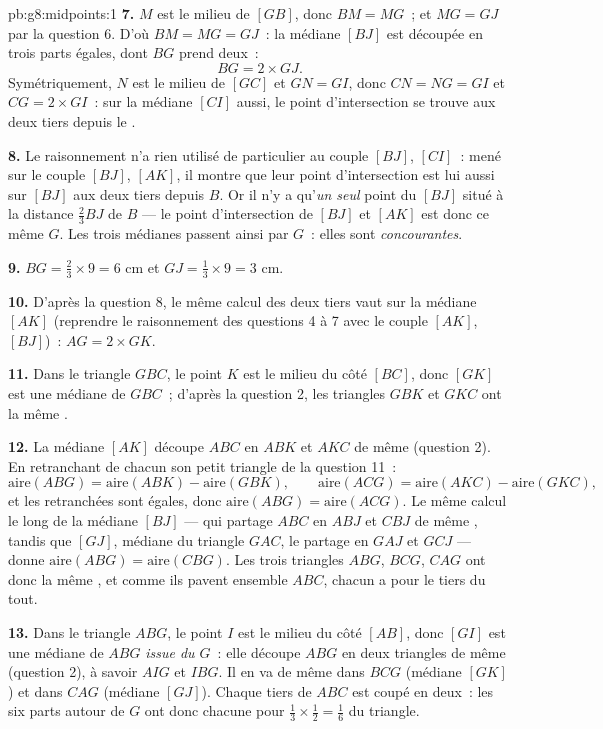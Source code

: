 \begin{solution}{pb:g8:midpoints:1}
\textbf{7.} $M$ est le milieu de $[GB]$, donc $BM = MG$~; et
$MG = GJ$ par la question 6. D'où $BM = MG = GJ$~: la médiane
$[BJ]$ est découpée en trois parts égales, dont $BG$ prend deux~:
\[
BG = 2 \times GJ .
\]
Symétriquement, $N$ est le milieu de $[GC]$ et $GN = GI$, donc
$CN = NG = GI$ et $CG = 2 \times GI$~: sur la médiane $[CI]$ aussi,
le point d'intersection se trouve aux deux tiers depuis le .

\textbf{8.} Le raisonnement n'a rien utilisé de particulier au
couple $[BJ]$, $[CI]$~: mené sur le couple $[BJ]$, $[AK]$, il montre
que leur point d'intersection est lui aussi sur $[BJ]$ aux deux
tiers depuis $B$. Or il n'y a qu'\emph{un seul} point du 
$[BJ]$ situé à la distance $\frac23 BJ$ de $B$ --- le point
d'intersection de $[BJ]$ et $[AK]$ est donc ce même $G$. Les trois
médianes passent ainsi par $G$~: elles sont \emph{concourantes}.

\textbf{9.} $BG = \frac23 \times 9 = 6$ cm et
$GJ = \frac13 \times 9 = 3$ cm.

\textbf{10.} D'après la question 8, le même calcul des deux tiers
vaut sur la médiane $[AK]$ (reprendre le raisonnement des questions
4 à 7 avec le couple $[AK]$, $[BJ]$)~: $AG = 2 \times GK$.

\textbf{11.} Dans le triangle $GBC$, le point $K$ est le milieu du
côté $[BC]$, donc $[GK]$ est une médiane de $GBC$~; d'après la
question 2, les triangles $GBK$ et $GKC$ ont la même .

\textbf{12.} La médiane $[AK]$ découpe $ABC$ en $ABK$ et $AKC$ de
même  (question 2). En retranchant de chacun son petit triangle
de la question 11~:
\[
\text{aire}(ABG) = \text{aire}(ABK) - \text{aire}(GBK),
\qquad
\text{aire}(ACG) = \text{aire}(AKC) - \text{aire}(GKC),
\]
et les  retranchées sont égales, donc
$\text{aire}(ABG) = \text{aire}(ACG)$. Le même calcul le long de la
médiane $[BJ]$ --- qui partage $ABC$ en $ABJ$ et $CBJ$ de même ,
tandis que $[GJ]$, médiane du triangle $GAC$, le partage en $GAJ$ et
$GCJ$ --- donne $\text{aire}(ABG) = \text{aire}(CBG)$. Les trois
triangles $ABG$, $BCG$, $CAG$ ont donc la même , et comme ils
pavent ensemble $ABC$, chacun a pour  le tiers du tout.

\textbf{13.} Dans le triangle $ABG$, le point $I$ est le milieu du
côté $[AB]$, donc $[GI]$ est une médiane de $ABG$ \emph{issue du
 $G$}~: elle découpe $ABG$ en deux triangles de même 
(question 2), à savoir $AIG$ et $IBG$. Il en va de même dans $BCG$
(médiane $[GK]$) et dans $CAG$ (médiane $[GJ]$). Chaque tiers de
$ABC$ est coupé en deux~: les six parts autour de $G$ ont donc
chacune pour  $\frac13 \times \frac12 = \frac16$ du triangle.


\end{solution}
